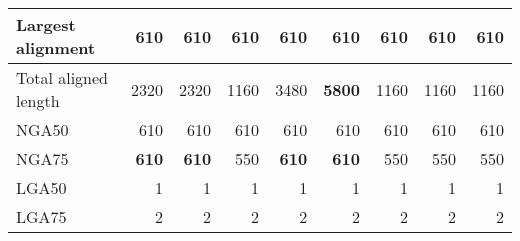 \documentclass[12pt,a4paper]{article}
\begin{document}
\begin{table}[ht]
\begin{center}
\begin{tabular}{|l*{8}{|r}|}
Largest alignment & 610 & 610 & 610 & 610 & 610 & 610 & 610 & 610 \\ \hline
Total aligned length & 2320 & 2320 & 1160 & 3480 & {\bf 5800} & 1160 & 1160 & 1160 \\ \hline
NGA50 & 610 & 610 & 610 & 610 & 610 & 610 & 610 & 610 \\ \hline
NGA75 & {\bf 610} & {\bf 610} & 550 & {\bf 610} & {\bf 610} & 550 & 550 & 550 \\ \hline
LGA50 & 1 & 1 & 1 & 1 & 1 & 1 & 1 & 1 \\ \hline
LGA75 & 2 & 2 & 2 & 2 & 2 & 2 & 2 & 2 \\ \hline
\end{tabular}
\end{center}
\end{table}
\end{document}
